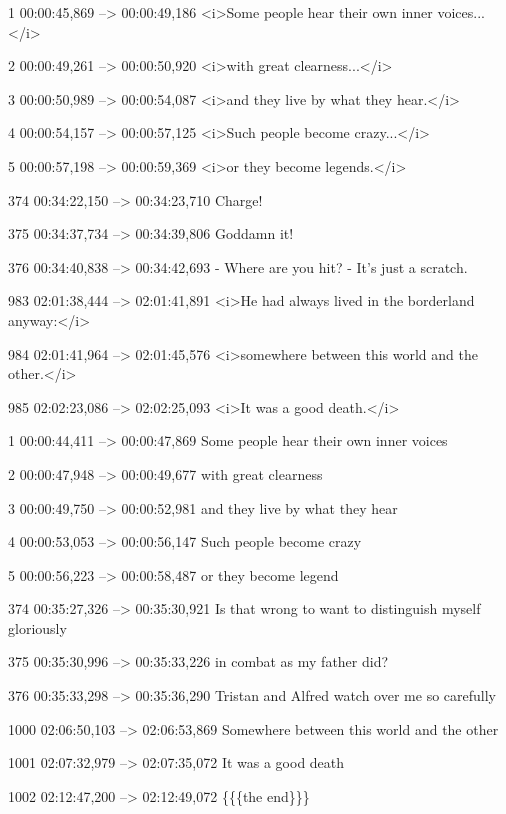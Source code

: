 \begin{subexam}
1
00:00:45,869 --> 00:00:49,186
<i>Some people hear 
their own inner voices...</i>

2
00:00:49,261 --> 00:00:50,920
<i>with great clearness...</i>

3
00:00:50,989 --> 00:00:54,087
<i>and they live by what they hear.</i>

4
00:00:54,157 --> 00:00:57,125
<i>Such people become crazy...</i>

5
00:00:57,198 --> 00:00:59,369
<i>or they become legends.</i>

374
00:34:22,150 --> 00:34:23,710
Charge!

375
00:34:37,734 --> 00:34:39,806
Goddamn it!

376
00:34:40,838 --> 00:34:42,693
- Where are you hit?
- It's just a scratch.

983
02:01:38,444 --> 02:01:41,891
<i>He had always lived
in the borderland anyway:</i>

984
02:01:41,964 --> 02:01:45,576
<i>somewhere between this world
and the other.</i>

985
02:02:23,086 --> 02:02:25,093
<i>It was a good death.</i>
\end{subexam}
\hspace{0.5cm}
\begin{subexam}
1
00:00:44,411 --> 00:00:47,869
Some people hear their own
inner voices

2
00:00:47,948 --> 00:00:49,677
with great clearness

3
00:00:49,750 --> 00:00:52,981
and they live
by what they hear

4
00:00:53,053 --> 00:00:56,147
Such people become crazy

5
00:00:56,223 --> 00:00:58,487
or they become legend

374
00:35:27,326 --> 00:35:30,921
Is that wrong to want
to distinguish myself gloriously

375
00:35:30,996 --> 00:35:33,226
in combat as my father did?

376
00:35:33,298 --> 00:35:36,290
Tristan and Alfred
watch over me so carefully

1000
02:06:50,103 --> 02:06:53,869
Somewhere between this world
and the other

1001
02:07:32,979 --> 02:07:35,072
It was a good death

1002
02:12:47,200 --> 02:12:49,072
\{\{\{the end\}\}\}
\end{subexam}


